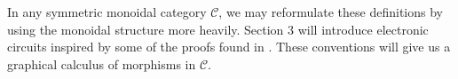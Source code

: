 \documentclass[../thesis.tex]{subfiles}
\begin{document}
            In any symmetric monoidal category $\mathcal{C}$, we may reformulate these definitions by using the monoidal structure more heavily. Section 3 will introduce electronic circuits inspired by some of the proofs found in \cite{Loday12}. These conventions will give us a graphical calculus of morphisms in $\mathcal{C}$.
                    




                    



\end{document}
